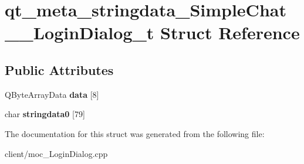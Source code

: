 \hypertarget{structqt__meta__stringdata__SimpleChat____LoginDialog__t}{\section{qt\-\_\-meta\-\_\-stringdata\-\_\-\-Simple\-Chat\-\_\-\-\_\-\-Login\-Dialog\-\_\-t Struct Reference}
\label{structqt__meta__stringdata__SimpleChat____LoginDialog__t}
}
\subsection*{Public Attributes}
\begin{DoxyCompactItemize}
\item 
\hypertarget{structqt__meta__stringdata__SimpleChat____LoginDialog__t_adb70dc61994b33b1cb463672704fd5be}{Q\-Byte\-Array\-Data {\bfseries data} \mbox{[}8\mbox{]}}\label{structqt__meta__stringdata__SimpleChat____LoginDialog__t_adb70dc61994b33b1cb463672704fd5be}

\item 
\hypertarget{structqt__meta__stringdata__SimpleChat____LoginDialog__t_af88330f3d5b4b8017071b7d588abceb1}{char {\bfseries stringdata0} \mbox{[}79\mbox{]}}\label{structqt__meta__stringdata__SimpleChat____LoginDialog__t_af88330f3d5b4b8017071b7d588abceb1}

\end{DoxyCompactItemize}


The documentation for this struct was generated from the following file\-:\begin{DoxyCompactItemize}
\item 
client/moc\-\_\-\-Login\-Dialog.\-cpp\end{DoxyCompactItemize}
